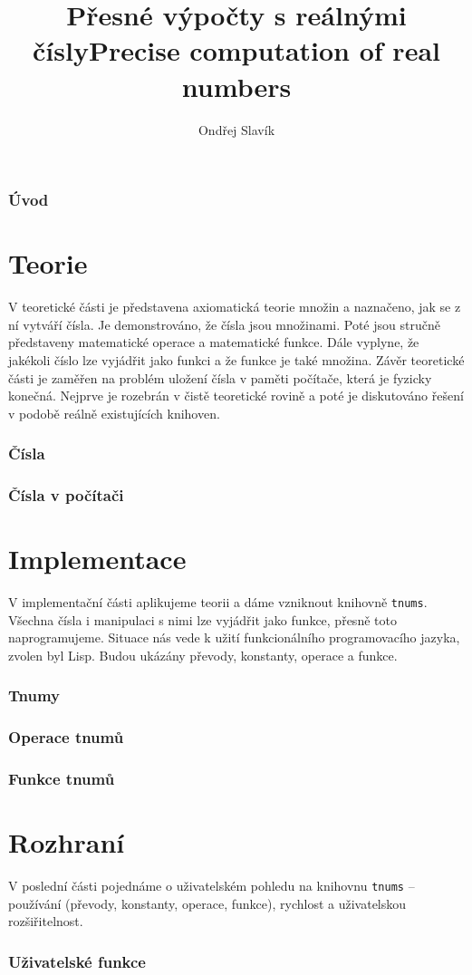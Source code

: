 \documentclass[
master=false,
field=inf,
encoding=utf8,
language=czech,
printversion=true,]{kidiplom}
\title{Přesné výpočty s reálnými čísly}
\title[english]{Precise computation of real numbers}
\author{Ondřej Slavík}
\newcommand{\mypart}{\newpage\part}
\begin{document}
\setcounter{tocdepth}{3}
\maketitle
\section{Úvod}

\mypart{Teorie}
V teoretické části je představena axiomatická teorie množin a naznačeno, jak se z ní vytváří čísla. Je demonstrováno, že čísla jsou množinami. Poté jsou stručně představeny matematické operace a matematické funkce. Dále vyplyne, že jakékoli číslo lze vyjádřit jako funkci a že funkce je také množina. Závěr teoretické části je zaměřen na problém uložení čísla v paměti počítače, která je fyzicky konečná. Nejprve je rozebrán v čistě teoretické rovině a poté je diskutováno řešení v podobě reálně existujících knihoven.
\section{Čísla}\label{kap:cisla}

\clearpage
\section{Čísla v počítači}

\mypart{Implementace}
V implementační části aplikujeme teorii a dáme vzniknout knihovně \texttt{tnums}. Všechna čísla i manipulaci s nimi lze vyjádřit jako funkce, přesně toto naprogramujeme. Situace nás vede k užití funkcionálního programovacího jazyka, zvolen byl Lisp. Budou ukázány převody, konstanty, operace a funkce.
\section{Tnumy}

\section{Operace tnumů}

\section{Funkce tnumů}

\mypart{Rozhraní}\label{cast:rozhrani}
V poslední části pojednáme o uživatelském pohledu na knihovnu \texttt{tnums} -- používání (převody, konstanty, operace, funkce), rychlost a uživatelskou rozšiřitelnost.
\section{Uživatelské funkce}

\clearpage
\end{document}
